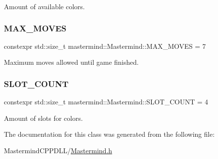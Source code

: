 Amount of available colors. 

\hypertarget{classmastermind_1_1_mastermind_a8bbb0daf2ebb27f688f1a30cd4488be1}{}\label{classmastermind_1_1_mastermind_a8bbb0daf2ebb27f688f1a30cd4488be1} 
\subsubsection{\texorpdfstring{M\+A\+X\+\_\+\+M\+O\+V\+ES}{MAX\_MOVES}}
{\footnotesize\ttfamily constexpr std\+::size\+\_\+t mastermind\+::\+Mastermind\+::\+M\+A\+X\+\_\+\+M\+O\+V\+ES = 7\hspace{0.3cm}{\ttfamily [static]}}



Maximum moves allowed until game finished. 

\hypertarget{classmastermind_1_1_mastermind_ad4cfc8127641ff8dfe89d65ae232331c}{}\label{classmastermind_1_1_mastermind_ad4cfc8127641ff8dfe89d65ae232331c} 
\subsubsection{\texorpdfstring{S\+L\+O\+T\+\_\+\+C\+O\+U\+NT}{SLOT\_COUNT}}
{\footnotesize\ttfamily constexpr std\+::size\+\_\+t mastermind\+::\+Mastermind\+::\+S\+L\+O\+T\+\_\+\+C\+O\+U\+NT = 4\hspace{0.3cm}{\ttfamily [static]}}



Amount of slots for colors. 



The documentation for this class was generated from the following file\+:\begin{DoxyCompactItemize}
\item 
Mastermind\+C\+P\+P\+D\+L\+L/\hyperlink{_mastermind_8h}{Mastermind.\+h}\end{DoxyCompactItemize}
